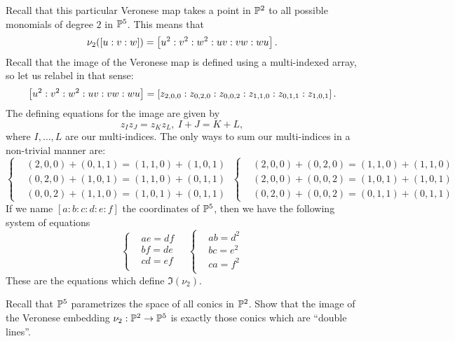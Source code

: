\documentclass[12pt]{memoir}
\begin{document}
\begin{ptcbr}
  Recall that this particular Veronese map takes a point in $\mathbb{P}^2$ to all possible monomials of degree $2$ in $\mathbb{P}^5$. This means that 
  $$\nu_2(\left\lbrack u:v:w\right\rbrack)=\left\lbrack u^2:v^2:w^2:uv:vw:wu\right\rbrack.$$
  Recall that the image of the Veronese map is defined using a multi-indexed array, so let us relabel in that sense:
  $$\left\lbrack u^2:v^2:w^2:uv:vw:wu\right\rbrack=\left\lbrack z_{2,0,0}:z_{0,2,0}:z_{0,0,2}:z_{1,1,0}:z_{0,1,1}:z_{1,0,1}\right\rbrack.$$
  The defining equations for the image are given by 
  $$z_Iz_J=z_Kz_L,\ I+J=K+L,$$
  where $I,\dots,L$ are our multi-indices. The only ways to sum our multi-indices in a non-trivial manner are:
  $$
  \left\lbrace
  \begin{aligned}
    &(2,0,0)+(0,1,1)=(1,1,0)+(1,0,1)\\
    &(0,2,0)+(1,0,1)=(1,1,0)+(0,1,1)\\
    &(0,0,2)+(1,1,0)=(1,0,1)+(0,1,1)
  \end{aligned}
  \right.\ 
  \left\lbrace
  \begin{aligned}
    &(2,0,0)+(0,2,0)=(1,1,0)+(1,1,0)\\
    &(2,0,0)+(0,0,2)=(1,0,1)+(1,0,1)\\
    &(0,2,0)+(0,0,2)=(0,1,1)+(0,1,1)
  \end{aligned}
  \right.
  $$
  If we name $[a:b:c:d:e:f]$ the coordinates of $\mathbb{P}^5$, then we have the following system of equations 
  $$
  \left\lbrace
  \begin{aligned}
    &ae=df\\
    &bf=de\\
    &cd=ef\\
  \end{aligned}
  \right.\quad 
  \left\lbrace
  \begin{aligned}
    &ab=d^2\\
    &bc=e^2\\
    &ca=f^2\\
  \end{aligned}
  \right.
  $$
  These are the equations which define $\Im(\nu_2)$.
\end{ptcbr}

\begin{Ej}
  Recall that $\mathbb{P}^5$ parametrizes the space of all conics in $\mathbb{P}^2$. Show that the image of the Veronese embedding $\nu_2:\mathbb{P}^2\to\mathbb{P}^5$ is exactly those conics which are ``double lines''.
\end{Ej}
\end{document}
